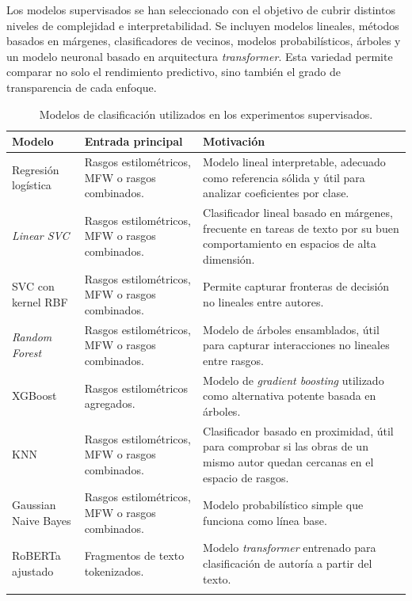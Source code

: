 \documentclass[IB]{TFUOC}%
\begin{document}
Los modelos supervisados se han seleccionado con el objetivo de cubrir distintos niveles de complejidad e interpretabilidad. Se incluyen modelos lineales, métodos basados en márgenes, clasificadores de vecinos, modelos probabilísticos, árboles y un modelo neuronal basado en arquitectura \textit{transformer}. Esta variedad permite comparar no solo el rendimiento predictivo, sino también el grado de transparencia de cada enfoque.

\begin{longtable}{|p{4cm}|p{4.6cm}|p{6.3cm}|}
\hline
\textbf{Modelo} & \textbf{Entrada principal} & \textbf{Motivación} \\
\hline

Regresión logística &
Rasgos estilométricos, MFW o rasgos combinados. &
Modelo lineal interpretable, adecuado como referencia sólida y útil para analizar coeficientes por clase. \\
\hline

\textit{Linear SVC} &
Rasgos estilométricos, MFW o rasgos combinados. &
Clasificador lineal basado en márgenes, frecuente en tareas de texto por su buen comportamiento en espacios de alta dimensión. \\
\hline

SVC con kernel RBF &
Rasgos estilométricos, MFW o rasgos combinados. &
Permite capturar fronteras de decisión no lineales entre autores. \\
\hline

\textit{Random Forest} &
Rasgos estilométricos, MFW o rasgos combinados. &
Modelo de árboles ensamblados, útil para capturar interacciones no lineales entre rasgos. \\
\hline

XGBoost &
Rasgos estilométricos agregados. &
Modelo de \textit{gradient boosting} utilizado como alternativa potente basada en árboles. \\
\hline

KNN &
Rasgos estilométricos, MFW o rasgos combinados. &
Clasificador basado en proximidad, útil para comprobar si las obras de un mismo autor quedan cercanas en el espacio de rasgos. \\
\hline

Gaussian Naive Bayes &
Rasgos estilométricos, MFW o rasgos combinados. &
Modelo probabilístico simple que funciona como línea base. \\
\hline

RoBERTa ajustado &
Fragmentos de texto tokenizados. &
Modelo \textit{transformer} entrenado para clasificación de autoría a partir del texto. \\
\hline

\caption{Modelos de clasificación utilizados en los experimentos supervisados.}
\label{tab:modelos-clasificacion}
\end{longtable}
\end{document}
